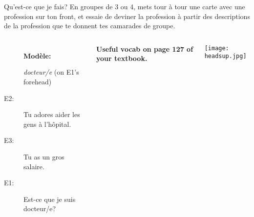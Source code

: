 \begin{frame}{Qu'est-ce que je fais?}
  En groupes de 3 ou 4, mets tour à tour une carte avec une profession sur ton front, et essaie de deviner la profession à partir des descriptions de la profession que te donnent tes camarades de groupe. \\
  \begin{columns}
      \begin{description}
        \item[] \textbf{Modèle:}
        \item[] \emph{docteur/e} (on E1's forehead)
        \item[E2:] Tu adores aider les gens à l'hôpital.
        \item[] 
        \item[E3:] Tu as un gros salaire.
        \item[] 
        \item[E1:] Est-ce que je suis docteur/e?
        \item[] 
      \end{description}
      \begin{center}
        \scriptsize
        \textbf{Useful vocab on page 127 of your textbook.}
      \end{center}
      \begin{center}
        \texttt{[image: headsup.jpg]}
      \end{center}
  \end{columns}
\end{frame}